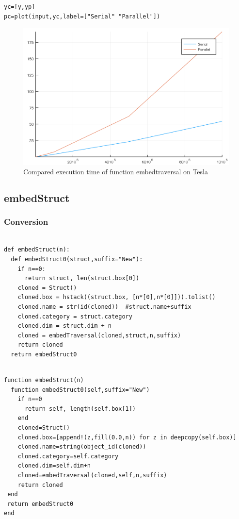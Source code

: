 \documentclass[a4paper,12pt]{article}
\begin{document}
\newpage

\noindent {}
\begin{Verbatim}[fontsize=\footnotesize]
yc=[y,yp]
pc=plot(input,yc,label=["Serial" "Parallel"])
\end{Verbatim}
\begin{figure}[!h]
\centering
\includegraphics[scale=0.08]{compembedtraversal.png}
\caption{Compared execution time of function embedtraversal on Tesla}
\end{figure}

\newpage

\subsection{embedStruct}
\subsubsection{Conversion}
\begin{Verbatim}[fontsize=\footnotesize]

def embedStruct(n):
  def embedStruct0(struct,suffix="New"):
    if n==0:
      return struct, len(struct.box[0])
    cloned = Struct()
    cloned.box = hstack((struct.box, [n*[0],n*[0]])).tolist()
    cloned.name = str(id(cloned))  #struct.name+suffix
    cloned.category = struct.category
    cloned.dim = struct.dim + n
    cloned = embedTraversal(cloned,struct,n,suffix) 
    return cloned
  return embedStruct0  
\end{Verbatim}
\begin{Verbatim}[fontsize=\footnotesize]

function embedStruct(n)
  function embedStruct0(self,suffix="New")
    if n==0
      return self, length(self.box[1])
    end
    cloned=Struct()
    cloned.box=[append!(z,fill(0.0,n)) for z in deepcopy(self.box)]
    cloned.name=string(object_id(cloned))
    cloned.category=self.category
    cloned.dim=self.dim+n
    cloned=embedTraversal(cloned,self,n,suffix)
    return cloned
 end
 return embedStruct0
end
\end{Verbatim}
\end{document}
